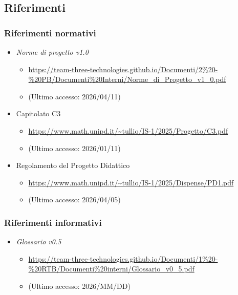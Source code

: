 \documentclass[a4paper,12pt]{article}
\begin{document}
{        \subsection{Riferimenti} {
            \subsubsection{Riferimenti normativi} {
                \begin{itemize}
                    \item \textit{Norme di progetto v1.0}
                    \begin{itemize}
                        \item \url{https://team-three-technologies.github.io/Documenti/2%20-%20PB/Documenti%20Interni/Norme_di_Progetto_v1_0.pdf}
                        \item[] (Ultimo accesso: 2026/04/11)
                    \end{itemize}
                    \item Capitolato C3
                    \begin{itemize}
                        \item \url{https://www.math.unipd.it/~tullio/IS-1/2025/Progetto/C3.pdf}
                        \item[] (Ultimo accesso: 2026/01/11)
                    \end{itemize}
                    \item Regolamento del Progetto Didattico
                    \begin{itemize}
                        \item \url{https://www.math.unipd.it/~tullio/IS-1/2025/Dispense/PD1.pdf}
                        \item[] (Ultimo accesso: 2026/04/05)
                    \end{itemize}
                \end{itemize}
            }
            \subsubsection{Riferimenti informativi} {
                \begin{itemize}
                    \item \textit{Glossario v0.5}
                    \begin{itemize}
                        \item \url{https://team-three-technologies.github.io/Documenti/1%20-%20RTB/Documenti%20interni/Glossario_v0_5.pdf}
                        \item[] (Ultimo accesso: 2026/MM/DD)
                    \end{itemize}
                \end{itemize}
            }
        }
    }
\end{document}
